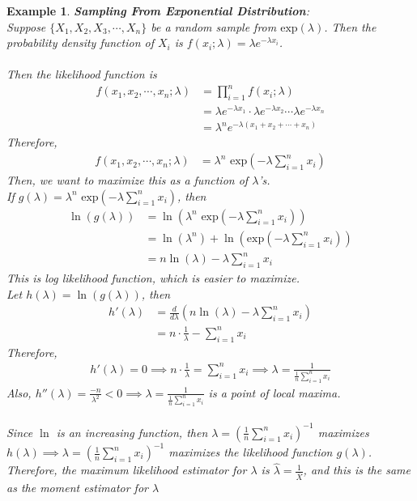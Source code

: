 \documentclass[11pt,oneside]{book}
\theoremstyle{newStyle}
\newtheorem{ex}{Example}[section]
\begin{document}
\begin{ex}
\textbf{Sampling From Exponential Distribution}:\\
Suppose $\{X_1,X_2,X_3,\cdots,X_n\}$ be a random sample from $\text{exp}(\lambda)$. Then the probability density function of $X_i$ is $f(x_i;\lambda)=\lambda e^{-\lambda x_i}$.\\
\hfill\\
Then the likelihood function is \begin{align*}
f(x_1,x_2,\cdots,x_n;\lambda)&=\prod_{i=1}^n f(x_i;\lambda)\\
&=\lambda e^{-\lambda x_1}\cdot \lambda e^{-\lambda x_2}\cdots \lambda e^{-\lambda x_n}\\
&=\lambda^n e^{-\lambda(x_1+x_2+\cdots+x_n)}
\end{align*}
Therefore, \begin{align*}
f(x_1,x_2,\cdots,x_n;\lambda)&=\lambda^n \text{ exp}(-\lambda \sum_{i=1}^nx_i)
\end{align*}
Then, we want to maximize this as a function of $\lambda$'s. \\
If $g(\lambda)=\lambda^n \text{ exp}(-\lambda \sum_{i=1}^nx_i)$, then \begin{align*}
\ln(g(\lambda))&=\ln(\lambda^n\text{ exp}(-\lambda \sum_{i=1}^nx_i))\\
&=\ln(\lambda^n)+\ln(\text{exp}(-\lambda\sum_{i=1}^nx_i))\\
&=n\ln (\lambda)-\lambda\sum_{i=1}^n x_i
\end{align*}
This is log likelihood function, which is easier to maximize.\\
Let $h(\lambda)=\ln (g(\lambda))$, then \begin{align*}
h'(\lambda)&=\frac{d}{d\lambda}\left(n\ln (\lambda)-\lambda \sum_{i=1}^n x_i \right)\\
&=n\cdot  \frac{1}{\lambda}-\sum_{i=1}^n x_i
\end{align*} 
Therefore, \begin{align*}
h'(\lambda)=0\implies n\cdot \frac{1}{\lambda}=\sum_{i=1}^n x_i\implies \lambda =\frac{1}{\frac{1}{n}\sum_{i=1}^n x_i}
\end{align*}
Also, $h''(\lambda)=\frac{-n}{\lambda^2}<0\implies \lambda =\frac{1}{\frac{1}{n}\sum_{i=1}^n x_i}$ is a point of local maxima.\\
\hfill\\
Since $\ln$ is an increasing function, then $\lambda =\left(\frac{1}{n}\sum_{i=1}^nx_i \right)^{-1}$ maximizes $h(\lambda)\implies \lambda = \left(\frac{1}{n}\sum_{i=1}^nx_i \right)^{-1}$ maximizes the likelihood function $g(\lambda)$. Therefore, the maximum likelihood estimator for $\lambda$ is $\widehat{\lambda}=\frac{1}{\overline{X}}$, and this is the same as the moment estimator for $\lambda$
\end{ex}
\end{document}
